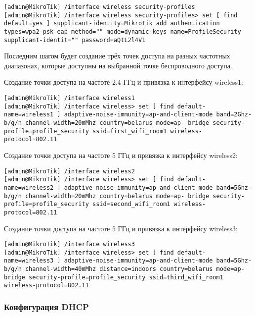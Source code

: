 \begin{lstlisting}
[admin@MikroTik] /interface wireless security-profiles
[admin@MikroTik] /interface wireless security-profiles> set [ find default=yes ] supplicant-identity=MikroTik add authentication types=wpa2-psk eap-method="" mode=dynamic-keys name=ProfileSecurity supplicant-identit="" password=aQtL2l4V1
\end{lstlisting}

Последним шагом будет создание трёх точек доступа на разных частотных диапазонах, которые доступны на выбранной точке беспроводного доступа. 

Создание точки доступа на частоте 2.4 ГГц и привязка к интерфейсу wireless1:

\begin{lstlisting}
[admin@MikroTik] /interface wireless1
[admin@MikroTik] /interface wireless> set [ find default-name=wireless1 ] adaptive-noise-immunity=ap-and-client-mode band=2Ghz-b/g/n channel-width=20mMhz country=belarus mode=ap- bridge security-profile=profile_security ssid=first_wifi_room1 wireless-protocol=802.11
\end{lstlisting}

Создание точки доступа на частоте 5 ГГц и привязка к интерфейсу wireless2:

\begin{lstlisting}
[admin@MikroTik] /interface wireless2
[admin@MikroTik] /interface wireless> set [ find default-name=wireless2 ] adaptive-noise-immunity=ap-and-client-mode band=5Ghz-b/g/n channel-width=20mMhz country=belarus mode=ap- bridge security-profile=profile_security ssid=second_wifi_room1 wireless-protocol=802.11
\end{lstlisting}

Создание точки доступа на частоте 5 ГГц и привязка к интерфейсу wireless3:

\begin{lstlisting}
[admin@MikroTik] /interface wireless3
[admin@MikroTik] /interface wireless> set [ find default-name=wireless3 ] adaptive-noise-immunity=ap-and-client-mode band=5Ghz-b/g/n channel-width=40mMhz distance=indoors country=belarus mode=ap- bridge security-profile=profile_security ssid=third_wifi_room1 wireless-protocol=802.11
\end{lstlisting}

\subsubsection{Конфигурация DHCP}

